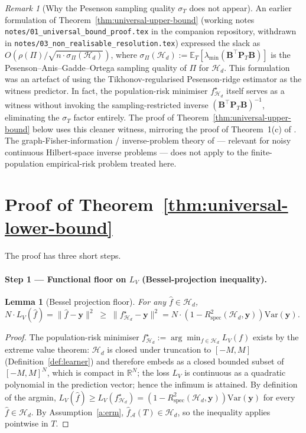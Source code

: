 \documentclass[11pt,a4paper]{article}
\theoremstyle{plain}
\newtheorem{lemma}[theorem]{Lemma}
\theoremstyle{definition}
\theoremstyle{remark}
\newtheorem{remark}[theorem]{Remark}
\newcommand{\by}{\mathbf{y}}
\newcommand{\bP}{\mathbf{P}}
\newcommand{\bB}{\mathbf{B}}
\newcommand{\E}{\mathbb{E}}
\newcommand{\R}{\mathbb{R}}
\newcommand{\Var}{\mathrm{Var}}
\newcommand{\Rspec}{R^2_{\mathrm{spec}}}
\newcommand{\Acal}{\mathcal{A}}
\newcommand{\Hcal}{\mathcal{H}}
\begin{document}
\begin{remark}[Why the Pesenson sampling quality $\sigma_T$ does not appear]
\label{rem:no-sigma-T-needed}
An earlier formulation of Theorem~\ref{thm:universal-upper-bound}
(working notes \texttt{notes/01\_universal\_bound\_proof.tex} in the
companion repository, withdrawn in \texttt{notes/03\_non\_realisable\_resolution.tex})
expressed the slack as $O(\rho(\Pi) /
\sqrt{n \cdot \sigma_\Pi(\Hcal_d)})$, where $\sigma_\Pi(\Hcal_d) :=
\E_T[\lambda_{\min}(\bB^\top \bP_T \bB)]$ is the
Pesenson--Anis--Gadde--Ortega sampling quality of $\Pi$ for $\Hcal_d$.
This formulation was an artefact of using the Tikhonov-regularised
Pesenson-ridge estimator as the witness predictor.  In fact, the
population-risk minimiser $f^\star_{\Hcal_d}$ itself serves as a
witness without invoking the sampling-restricted inverse $(\bB^\top
\bP_T \bB)^{-1}$, eliminating the $\sigma_T$ factor entirely.  The
proof of Theorem~\ref{thm:universal-upper-bound} below uses this
cleaner witness, mirroring the proof of Theorem~1(c) of
\citet{FossePallares2026applicabilityBound}.  The
graph-Fisher-information / inverse-problem theory of
\citet{BauerPereverzev2005,Cavalier2008} --- relevant for noisy
continuous Hilbert-space inverse problems --- does not apply to the
finite-population empirical-risk problem treated here.
\end{remark}

\section{Proof of Theorem~\ref{thm:universal-lower-bound}}
\label{sec:lower-bound-proof}

The proof has three short steps.

\paragraph{Step 1 — Functional floor on $L_V$ (Bessel-projection inequality).}

\begin{lemma}[Bessel projection floor]
\label{lem:bessel}
For any $\hat f \in \Hcal_d$,
$N \cdot L_V(\hat f) = \|\hat f - \by\|^2 \;\geq\; \|f^\star_{\Hcal_d} - \by\|^2 = N \cdot (1 - \Rspec(\Hcal_d, \by))\Var(\by)$.
\end{lemma}

\begin{proof}
The population-risk minimiser $f^\star_{\Hcal_d} := \arg\min_{f \in
\Hcal_d} L_V(f)$ exists by the extreme value theorem: $\Hcal_d$ is
closed under truncation to $[-M, M]$ (Definition~\ref{def:learner})
and therefore embeds as a closed bounded subset of $[-M, M]^N$,
which is compact in $\R^N$; the loss $L_V$ is continuous as a
quadratic polynomial in the prediction vector; hence the infimum is
attained.  By definition of the argmin, $L_V(\hat f) \geq
L_V(f^\star_{\Hcal_d}) = (1 - \Rspec(\Hcal_d, \by))\Var(\by)$ for
every $\hat f \in \Hcal_d$.  By Assumption~\ref{a:erm},
$\hat f_\Acal(T) \in \Hcal_d$, so the inequality applies pointwise
in $T$.
\end{proof}
\end{document}
